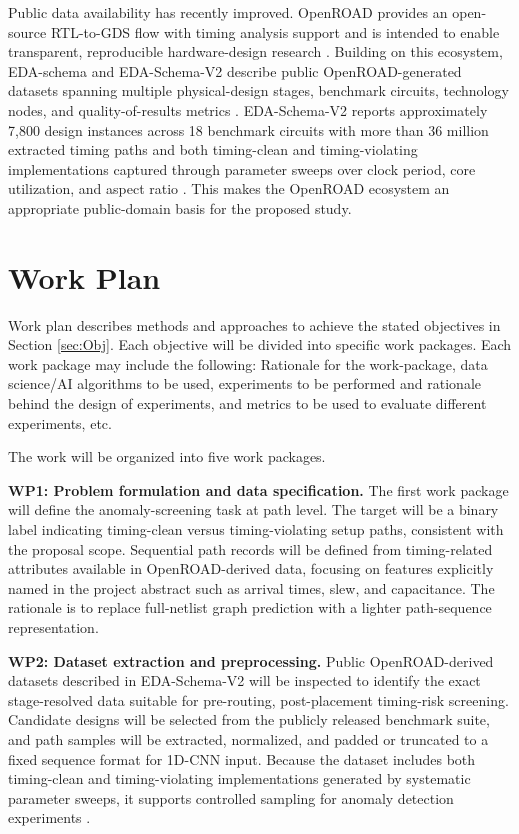 \documentclass[12pt,a4paper]{article}
\begin{document}
Public data availability has recently improved. OpenROAD provides an open-source RTL-to-GDS flow with timing analysis support and is intended to enable transparent, reproducible hardware-design research \cite{Ajayi2019OpenROAD,KahngOpenROAD}. Building on this ecosystem, EDA-schema and EDA-Schema-V2 describe public OpenROAD-generated datasets spanning multiple physical-design stages, benchmark circuits, technology nodes, and quality-of-results metrics \cite{Shrestha2024EDASchema,Shrestha2026EDASchemaV2}. EDA-Schema-V2 reports approximately 7,800 design instances across 18 benchmark circuits with more than 36 million extracted timing paths and both timing-clean and timing-violating implementations captured through parameter sweeps over clock period, core utilization, and aspect ratio \cite{Shrestha2026EDASchemaV2}. This makes the OpenROAD ecosystem an appropriate public-domain basis for the proposed study.

\section{Work Plan}
Work plan describes methods and approaches to achieve the stated objectives in Section \ref{sec:Obj}. Each objective will be divided into specific work packages. Each work package may include the following: Rationale for the work-package, data science/AI algorithms to be used, experiments to be performed and rationale behind the design of experiments, and metrics to be used to evaluate different experiments, etc. 

The work will be organized into five work packages.

\textbf{WP1: Problem formulation and data specification.} The first work package will define the anomaly-screening task at path level. The target will be a binary label indicating timing-clean versus timing-violating setup paths, consistent with the proposal scope. Sequential path records will be defined from timing-related attributes available in OpenROAD-derived data, focusing on features explicitly named in the project abstract such as arrival times, slew, and capacitance. The rationale is to replace full-netlist graph prediction with a lighter path-sequence representation.

\textbf{WP2: Dataset extraction and preprocessing.} Public OpenROAD-derived datasets described in EDA-Schema-V2 will be inspected to identify the exact stage-resolved data suitable for pre-routing, post-placement timing-risk screening. Candidate designs will be selected from the publicly released benchmark suite, and path samples will be extracted, normalized, and padded or truncated to a fixed sequence format for 1D-CNN input. Because the dataset includes both timing-clean and timing-violating implementations generated by systematic parameter sweeps, it supports controlled sampling for anomaly detection experiments \cite{Shrestha2026EDASchemaV2}.
\end{document}
